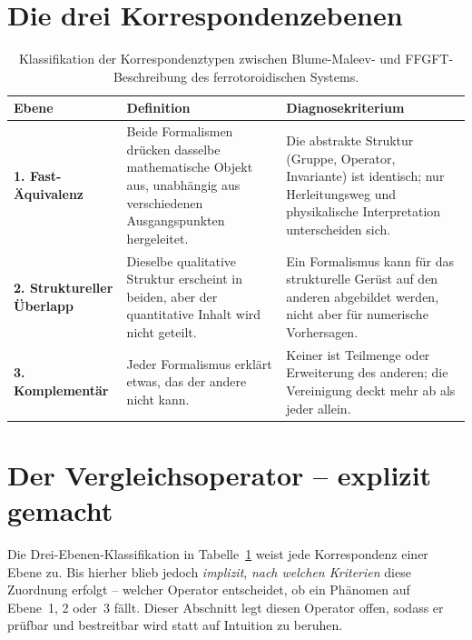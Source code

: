 \section{Die drei Korrespondenzebenen}

\begin{table}[htbp]
\centering
\caption{Klassifikation der Korrespondenztypen zwischen Blume-Maleev-
und FFGFT-Beschreibung des ferrotoroidischen Systems.}
\label{tab:ebenen}
\begin{tabular}{p{2.5cm}p{5.5cm}p{5.5cm}}
\toprule
\textbf{Ebene} & \textbf{Definition} & \textbf{Diagnosekriterium} \\
\midrule
\textbf{1. Fast-Äquivalenz} &
  Beide Formalismen drücken dasselbe mathematische Objekt aus, unabhängig
  aus verschiedenen Ausgangspunkten hergeleitet. &
  Die abstrakte Struktur (Gruppe, Operator, Invariante) ist identisch;
  nur Herleitungsweg und physikalische Interpretation unterscheiden sich. \\
\addlinespace
\textbf{2. Struktureller Überlapp} &
  Dieselbe qualitative Struktur erscheint in beiden, aber der quantitative
  Inhalt wird nicht geteilt. &
  Ein Formalismus kann für das strukturelle Gerüst auf den anderen
  abgebildet werden, nicht aber für numerische Vorhersagen. \\
\addlinespace
\textbf{3. Komplementär} &
  Jeder Formalismus erklärt etwas, das der andere nicht kann. &
  Keiner ist Teilmenge oder Erweiterung des anderen; die Vereinigung
  deckt mehr ab als jeder allein. \\
\bottomrule
\end{tabular}
\end{table}

\section{Der Vergleichsoperator -- explizit gemacht}

Die Drei-Ebenen-Klassifikation in Tabelle~\ref{tab:ebenen} weist jede
Korrespondenz einer Ebene zu. Bis hierher blieb jedoch \emph{implizit},
\emph{nach welchen Kriterien} diese Zuordnung erfolgt -- welcher Operator
entscheidet, ob ein Phänomen auf Ebene~1, 2 oder~3 fällt. Dieser Abschnitt
legt diesen Operator offen, sodass er prüfbar und bestreitbar wird statt
auf Intuition zu beruhen.

